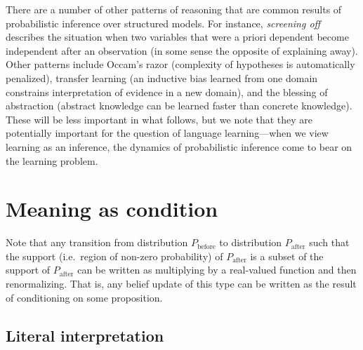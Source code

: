 \documentclass[12pt]{article}
\begin{document}
There are a number of other patterns of reasoning that are common results of probabilistic inference over structured models. 
For instance, \emph{screening off} describes the situation when two variables that were a priori dependent become independent after an observation (in some sense the opposite of explaining away).
Other patterns include Occam's razor (complexity of hypotheses is automatically penalized), transfer learning (an inductive bias learned from one domain constrains interpretation of evidence in a new domain), and the blessing of abstraction (abstract knowledge can be learned faster than concrete knowledge). 
These will be less important in what follows, but we note that they are potentially important for the question of language learning---when we view learning as an inference, the dynamics of probabilistic inference come to bear on the learning problem. 

 
\section{Meaning as condition}
\label{literal}


Note that any transition from distribution $P_{\text{before}}$ to distribution $P_{\text{after}}$ such that the support (i.e.\ region of non-zero probability) of $P_{\text{after}}$ is a subset of the support of $P_{\text{after}}$ can be written as multiplying by a real-valued function and then renormalizing. 
That is, any belief update of this type can be written as the result of conditioning on some proposition.



\subsection{\label{literal-listener}Literal interpretation}
\end{document}
